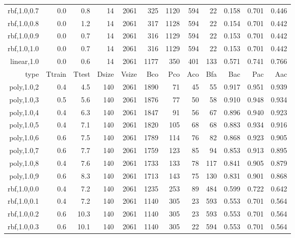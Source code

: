 \begin{longtable}{r|r|r|r|r|r|r|r|r|r|r|r}
  rbf,1.0,0.7  &     0.0 &     0.8 &    14 &  2061 &   325 &  1120 &   594 &    22 & 0.158 & 0.701 & 0.446 \\
  rbf,1.0,0.8  &     0.0 &     1.2 &    14 &  2061 &   317 &  1128 &   594 &    22 & 0.154 & 0.701 & 0.442 \\
  rbf,1.0,0.9  &     0.0 &     0.7 &    14 &  2061 &   316 &  1129 &   594 &    22 & 0.153 & 0.701 & 0.442 \\
  rbf,1.0,1.0  &     0.0 &     0.7 &    14 &  2061 &   316 &  1129 &   594 &    22 & 0.153 & 0.701 & 0.442 \\
   linear,1.0  &     0.0 &     0.6 &    14 &  2061 &  1177 &   350 &   401 &   133 & 0.571 & 0.741 & 0.766 \\
          type &  Ttrain &   Ttest & Dsize & Vsize &   Bco &   Pco &   Aco &   Bfa &   Bac &   Pac &   Aac \\
   poly,1.0,2  &     0.4 &     4.5 &   140 &  2061 &  1890 &    71 &    45 &    55 & 0.917 & 0.951 & 0.939 \\
   poly,1.0,3  &     0.5 &     5.6 &   140 &  2061 &  1876 &    77 &    50 &    58 & 0.910 & 0.948 & 0.934 \\
   poly,1.0,4  &     0.4 &     6.3 &   140 &  2061 &  1847 &    91 &    56 &    67 & 0.896 & 0.940 & 0.923 \\
   poly,1.0,5  &     0.4 &     7.1 &   140 &  2061 &  1820 &   105 &    68 &    68 & 0.883 & 0.934 & 0.916 \\
   poly,1.0,6  &     0.6 &     7.5 &   140 &  2061 &  1789 &   114 &    76 &    82 & 0.868 & 0.923 & 0.905 \\
   poly,1.0,7  &     0.6 &     7.7 &   140 &  2061 &  1759 &   123 &    85 &    94 & 0.853 & 0.913 & 0.895 \\
   poly,1.0,8  &     0.4 &     7.6 &   140 &  2061 &  1733 &   133 &    78 &   117 & 0.841 & 0.905 & 0.879 \\
   poly,1.0,9  &     0.6 &     8.3 &   140 &  2061 &  1713 &   143 &    75 &   130 & 0.831 & 0.901 & 0.868 \\
  rbf,1.0,0.0  &     0.4 &     7.2 &   140 &  2061 &  1235 &   253 &    89 &   484 & 0.599 & 0.722 & 0.642 \\
  rbf,1.0,0.1  &     0.4 &     7.2 &   140 &  2061 &  1140 &   305 &    23 &   593 & 0.553 & 0.701 & 0.564 \\
  rbf,1.0,0.2  &     0.6 &    10.3 &   140 &  2061 &  1140 &   305 &    23 &   593 & 0.553 & 0.701 & 0.564 \\
  rbf,1.0,0.3  &     0.6 &    10.1 &   140 &  2061 &  1140 &   305 &    22 &   594 & 0.553 & 0.701 & 0.564 \\

\end{longtable}
